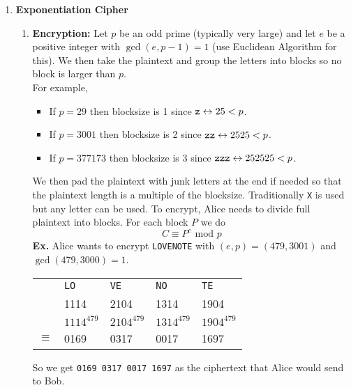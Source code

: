 \documentclass[class=article, crop=false]{standalone}
\begin{document}
\begin{enumerate}
	\item \textbf{Exponentiation Cipher}
	\begin{enumerate}
		\item \textbf{Encryption:} Let $p$ be an odd prime (typically very large) and let $e$ be a
		positive integer with $\gcd(e,p-1)=1$ (use Euclidean Algorithm for this).
		We then take the plaintext and group the letters into blocks so no block is
		larger than $p$. \\
		For example, 
		\begin{itemize}
			\item If $p=29$ then blocksize is 1 since $\verb|z|\leftrightarrow 25<p$.
			\item If $p=3001$ then blocksize is 2 since $\verb|zz|\leftrightarrow 2525<p$.
			\item If $p=377173$ then blocksize is 3 since $\verb|zzz|\leftrightarrow 252525<p$.
		\end{itemize}
		We then pad the plaintext with junk letters at the end if needed so that the
		plaintext length is a multiple of the blocksize. Traditionally \verb|X| is used but any letter can
		be used. To encrypt, Alice needs to divide full plaintext into blocks. For each block $P$ we do
		$$C \equiv P^e \mbox{ mod } p$$
		\textbf{Ex.} Alice wants to encrypt \verb|LOVENOTE| with $(e,p)=(479,3001)$ and $\gcd(479, 3000)=1$.
		\begin{table}[h!]
			\centering
			\begin{tabular}{c l l l l}
				$ $& \verb|LO|& \verb|VE|& \verb|NO|& \verb|TE| \\
				$ $& 1114& 2104& 1314& 1904 \\
				$ $& $1114^{479}$& $2104^{479}$ &$1314^{479}$ &$1904^{479}$ \\
				\hline
				$\equiv$ &0169 &0317 &0017 &1697
			\end{tabular}
		\end{table}
		So we get \verb|0169 0317 0017 1697| as the ciphertext that Alice would send to Bob.


\end{enumerate}
\end{enumerate}
\end{document}
